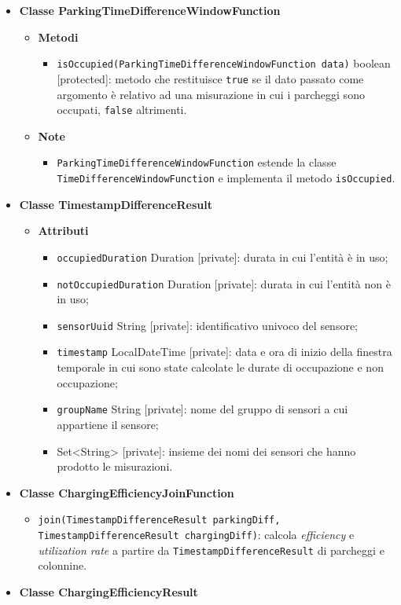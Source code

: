 \begin{itemize}
	\item \textbf{Classe ParkingTimeDifferenceWindowFunction}
	      \begin{itemize}
		      \item \textbf{Metodi}
		            \begin{itemize}
			            \item \texttt{isOccupied(ParkingTimeDifferenceWindowFunction data)} boolean [protected]: metodo che restituisce \texttt{true} se il dato passato come argomento è relativo ad una misurazione in cui i
			                  parcheggi sono occupati, \texttt{false} altrimenti.
		            \end{itemize}
		      \item \textbf{Note}
		            \begin{itemize}
			            \item \texttt{ParkingTimeDifferenceWindowFunction} estende la classe \\\texttt{TimeDifferenceWindowFunction} e implementa il metodo \texttt{isOccupied}.
		            \end{itemize}
	      \end{itemize}
	\item \textbf{Classe TimestampDifferenceResult}
	      \begin{itemize}
		      \item \textbf{Attributi}
		            \begin{itemize}
			            \item \texttt{occupiedDuration} Duration [private]: durata in cui l'entità è in uso;
			            \item \texttt{notOccupiedDuration} Duration [private]: durata in cui l'entità non è in uso;
			            \item \texttt{sensorUuid} String [private]: identificativo univoco del sensore;
			            \item \texttt{timestamp} LocalDateTime [private]: data e ora di inizio della finestra temporale in cui sono state calcolate le durate di occupazione e non occupazione;
			            \item \texttt{groupName} String [private]: nome del gruppo di sensori a cui appartiene il sensore;
			            \item \texttt{} Set<String> [private]: insieme dei nomi dei sensori che hanno prodotto le misurazioni.
		            \end{itemize}
	      \end{itemize}
	\item \textbf{Classe ChargingEfficiencyJoinFunction}
	      \begin{itemize}
		      \item \texttt{join(TimestampDifferenceResult parkingDiff, \\TimestampDifferenceResult chargingDiff)}: calcola \textit{efficiency} e \textit{utilization rate} a partire da \texttt{TimestampDifferenceResult}
		            di parcheggi e colonnine.
	      \end{itemize}
	\item \textbf{Classe ChargingEfficiencyResult}


\end{itemize}
